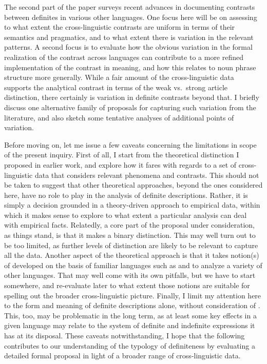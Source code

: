 \documentclass[output=paper
,modfonts
,nonflat]{langscibook}
\begin{document}
The second part of the paper surveys recent
advances in documenting contrasts between definites in various other
languages. One focus here will be on assessing to what extent the
cross-linguistic contrasts are uniform in terms of their semantics and
pragmatics, and to what extent there is variation in the relevant
patterns.  A second focus is to evaluate how the obvious variation in the formal
realization of the contrast across languages can contribute to a more
refined implementation of the contrast in meaning, and how this
relates to noun phrase structure more generally. While a fair amount of the
cross-linguistic data supports the analytical contrast in terms of the
weak vs.\ strong article distinction, there certainly is variation
in definite contrasts beyond that. I briefly discuss one alternative family of
proposals for capturing such variation from the literature, and also
sketch some tentative analyses of additional points of variation. 

Before moving on, let me issue a few caveats concerning the
limitations in scope of
the present inquiry. First of all, I start from the theoretical
distinction I proposed in earlier work, and explore how it fares with
regards to a set of cross-linguistic data that considers relevant
phenomena and contrasts. This should not be taken to suggest that
other theoretical approaches, beyond the ones considered here, have no
role to play in the analysis of definite descriptions. Rather, it is
simply a decision grounded in a theory-driven approach to empirical data, within
which it makes sense to explore to what extent a particular analysis
can deal with empirical facts. Relatedly, a core part of the proposal under
consideration, as things stand, is that it makes a binary
distinction. This may well turn out to be too limited, as further
levels of distinction are likely to be relevant to capture all the
data. Another aspect of the theoretical approach is that it takes
notion(s) of  developed on the basis of familiar languages
such as  and  to analyze a variety of other
languages. That may well come with its own pitfalls, but we have to start somewhere, and re-evaluate later to what
extent those notions are suitable for spelling out the broader
cross-linguistic picture. Finally, I limit my attention here to the
form and meaning of
definite descriptions alone, without consideration of
. This, too, may be problematic in the long term, as
at least some key effects in a given language may relate to the system
of definite and indefinite expressions it has at its disposal. These
caveats notwithstanding, I hope that the following contributes to our
understanding of the typology of definiteness by evaluating a detailed
formal proposal in light of a broader range of cross-linguistic data.
\end{document}

